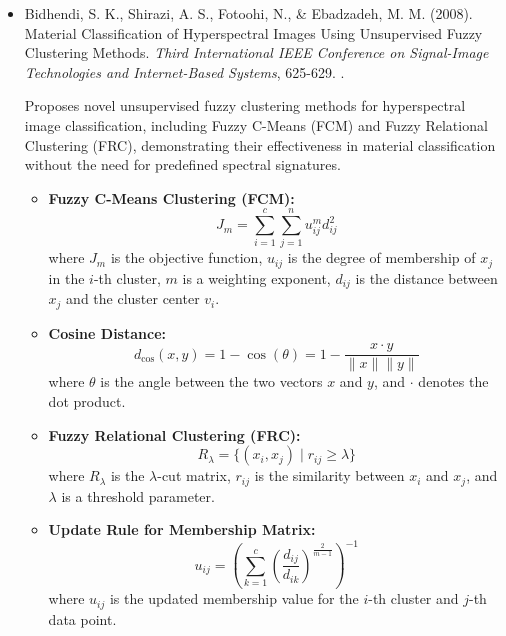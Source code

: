 \documentclass[10pt,svgnames,fragile]{beamer}
\begin{document}
\begin{frame}{}
\tiny
\begin{itemize}

    \item Bidhendi, S. K., Shirazi, A. S., Fotoohi, N., \& Ebadzadeh, M. M. (2008). Material Classification of Hyperspectral Images Using Unsupervised Fuzzy Clustering Methods. \textit{Third International IEEE Conference on Signal-Image Technologies and Internet-Based Systems}, 625-629. \href{https://doi.org/10.1109/SITIS.2007.113}{\color{blue}{DOI: 10.1109/SITIS.2007.113}}. \cite{bidhendiMaterialClassificationHyperspectral2007}
    
    {\color{gray}Proposes novel unsupervised fuzzy clustering methods for hyperspectral image classification, including Fuzzy C-Means (FCM) and Fuzzy Relational Clustering (FRC), demonstrating their effectiveness in material classification without the need for predefined spectral signatures.}
    \begin{itemize} \tiny
    \item \textbf{Fuzzy C-Means Clustering (FCM):}
    \[
    J_m = \sum_{i=1}^{c} \sum_{j=1}^{n} u_{ij}^m d_{ij}^2
    \]
    where \( J_m \) is the objective function, \( u_{ij} \) is the degree of membership of \( x_j \) in the \( i \)-th cluster, \( m \) is a weighting exponent, \( d_{ij} \) is the distance between \( x_j \) and the cluster center \( v_i \).

    \item \textbf{Cosine Distance:}
    \[
    d_{\text{cos}}(x, y) = 1 - \cos(\theta) = 1 - \frac{x \cdot y}{\|x\| \|y\|}
    \]
    where \( \theta \) is the angle between the two vectors \( x \) and \( y \), and \( \cdot \) denotes the dot product.

    \item \textbf{Fuzzy Relational Clustering (FRC):}
    \[
    R_{\lambda} = \{(x_i, x_j) \mid r_{ij} \geq \lambda\}
    \]
    where \( R_{\lambda} \) is the \(\lambda\)-cut matrix, \( r_{ij} \) is the similarity between \( x_i \) and \( x_j \), and \( \lambda \) is a threshold parameter.

    \item \textbf{Update Rule for Membership Matrix:}
    \[
    u_{ij} = \left( \sum_{k=1}^{c} \left( \frac{d_{ij}}{d_{ik}} \right)^{\frac{2}{m-1}} \right)^{-1}
    \]
    where \( u_{ij} \) is the updated membership value for the \( i \)-th cluster and \( j \)-th data point.
    \end{itemize}

\end{itemize}
\end{frame}
\end{document}
